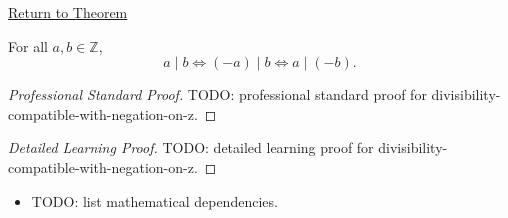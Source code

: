 \newpage
{}
\label{prf:divisibility-compatible-with-negation-on-z}

\begin{remark*}[Return]
\hyperref[prop:divisibility-compatible-with-negation-on-z]{Return to Theorem}
\end{remark*}

\begin{proposition*}
For all $a,b\in\mathbb{Z}$,
\[
a\mid b \Longleftrightarrow (-a)\mid b \Longleftrightarrow a\mid(-b).
\]
\end{proposition*}

\begin{proof}[Professional Standard Proof]
\LRAProofBodyStart
TODO: professional standard proof for divisibility-compatible-with-negation-on-z.
\end{proof}

\begin{proof}[Detailed Learning Proof]
\LRAProofBodyStart
TODO: detailed learning proof for divisibility-compatible-with-negation-on-z.
\end{proof}

\begin{remark*}
\end{remark*}

\begin{dependencies}
\begin{itemize}
  \item TODO: list mathematical dependencies.
\end{itemize}
\end{dependencies}

\clearpage
